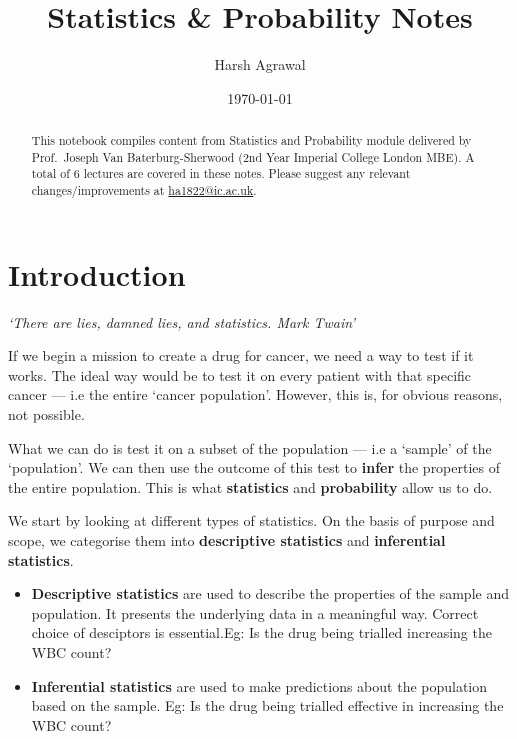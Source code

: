 \documentclass[letterpaper,12pt]{article}
\begin{document}
\title{Statistics \& Probability Notes}
\author{Harsh Agrawal}
\date{\today}
\maketitle

\begin{abstract}
	This notebook compiles content from Statistics and Probability module delivered by Prof.\ Joseph Van Baterburg-Sherwood (2nd Year Imperial College London MBE). 
	A total of 6 lectures are covered in these notes. Please suggest any relevant changes/improvements at \href{ha1822@ic.ac.uk}{ha1822@ic.ac.uk}.
\end{abstract}

\tableofcontents
\newpage
\section{Introduction}
\begin{center}
\textit{`There are lies, damned lies, and statistics. \- Mark Twain'}
\end{center}

If we begin a mission to create a drug for cancer, we need a way to test if it works. The ideal way would be to test it on every patient with that specific cancer --- i.e the entire `cancer population'. However, this is, for obvious reasons, not possible. 

What we can do is test it on a subset of the population --- i.e a `sample' of the `population'. We can then use the outcome of this test to \textbf{infer} the properties of the entire population. This is what \textbf{statistics} and \textbf{probability} allow us to do.

We start by looking at different types of statistics. On the basis of purpose and scope, we categorise them into \textbf{descriptive statistics} and \textbf{inferential statistics}.
\begin{itemize}
	\item \textbf{Descriptive statistics} are used to describe the properties of the sample and population. It presents the underlying data in a meaningful way. Correct choice of desciptors is essential.Eg: Is the drug being trialled increasing the WBC count? 
	\item \textbf{Inferential statistics} are used to make predictions about the population based on the sample. Eg: Is the drug being trialled effective in increasing the WBC count? 
	\end{itemize}
\end{document}
